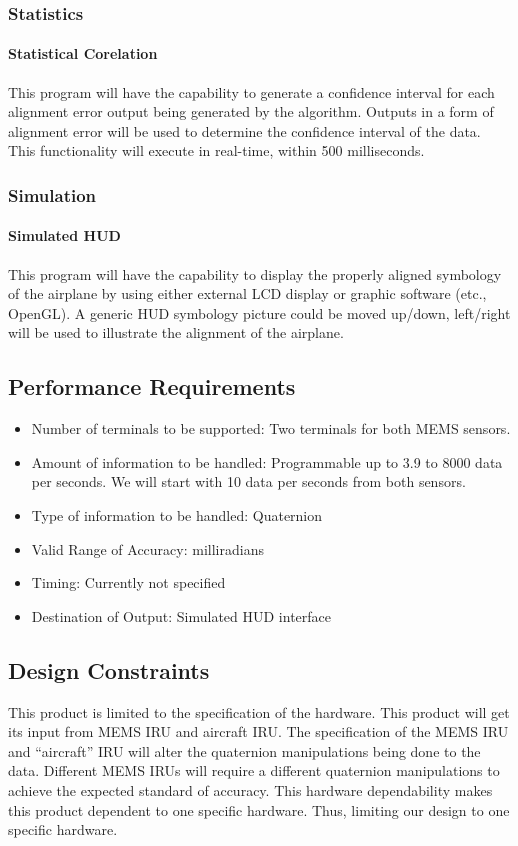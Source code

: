 \subsubsection{Statistics}
\paragraph{Statistical Corelation}
This program will have the capability to generate a confidence interval for each alignment error output being generated by the algorithm. Outputs in a form of alignment error will be used to determine the confidence interval of the data. This functionality will execute in real-time, within 500 milliseconds. 
\\
\subsubsection{Simulation}
\paragraph{Simulated HUD}
This program will have the capability to display the properly aligned symbology of the airplane by using either external LCD display or graphic software (etc., OpenGL). A generic HUD symbology picture could be moved up/down, left/right will be used to illustrate the alignment of the airplane.


\subsection{Performance Requirements}
\begin{itemize}
	\item Number of terminals to be supported: Two terminals for both MEMS sensors. 
	\item Amount of information to be handled: Programmable up to 3.9 to 8000 data per seconds. We will start with 10 data per seconds from both sensors. 
	\item Type of information to be handled: Quaternion 
	\item Valid Range of Accuracy: milliradians 
	\item Timing: Currently not specified 
	\item Destination of Output: Simulated HUD interface
\end{itemize}	

\subsection{Design Constraints}
This product is limited to the specification of the hardware. This product will get its input from MEMS IRU and aircraft IRU. The specification of the MEMS IRU and “aircraft” IRU will alter the quaternion manipulations being done to the data.  Different MEMS IRUs will require a different quaternion manipulations to achieve the expected standard of accuracy. This hardware dependability makes this product dependent to one specific hardware. Thus, limiting our design to one specific hardware.

